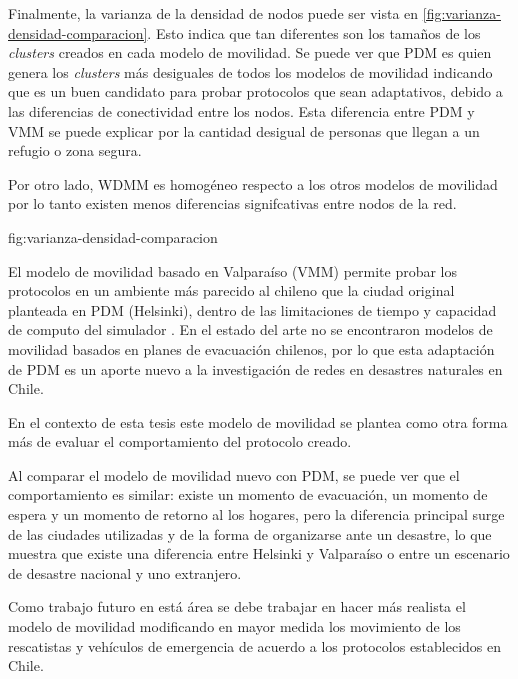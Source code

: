 Finalmente, la varianza de la densidad de nodos puede ser vista en
\ref{fig:varianza-densidad-comparacion}. Esto indica que tan diferentes son los
tamaños de los \textit{clusters} creados en cada modelo de movilidad. Se puede
ver que PDM es quien genera los \textit{clusters} más desiguales de todos los
modelos de movilidad indicando que es un buen candidato para probar protocolos
que sean adaptativos, debido a las diferencias de conectividad entre los nodos.
Esta diferencia entre PDM y VMM se puede explicar por la cantidad
desigual de personas que llegan a un refugio o zona segura.

Por otro lado, WDMM es homogéneo respecto a los otros modelos de movilidad por
lo tanto existen menos diferencias signifcativas entre nodos de la red.


{fig:varianza-densidad-comparacion}



El modelo de movilidad basado en Valparaíso (VMM) permite probar los protocolos en un
ambiente más parecido al chileno que la ciudad original planteada en PDM
(Helsinki), dentro de las limitaciones de tiempo y capacidad de computo del
simulador \theone. En el estado del arte no se encontraron modelos de movilidad
basados en planes de evacuación chilenos, por lo que esta adaptación de
PDM es un aporte nuevo a la investigación de redes en desastres naturales en
Chile.

En el contexto de esta tesis este modelo de movilidad se plantea como otra forma
más de evaluar el comportamiento del protocolo creado.

Al comparar el modelo de movilidad nuevo con PDM, se puede ver que el comportamiento es
similar: existe un momento de evacuación, un momento de espera y un momento de
retorno al los hogares, pero la diferencia principal surge de las ciudades
utilizadas y de la forma de organizarse ante un desastre, lo que muestra que
existe una diferencia entre Helsinki y Valparaíso o entre un escenario de
desastre nacional y uno extranjero.

Como trabajo futuro en está área se debe trabajar en hacer más realista el
modelo de movilidad modificando en mayor medida los movimiento de los
rescatistas y vehículos de emergencia de acuerdo a los protocolos establecidos
en Chile.

